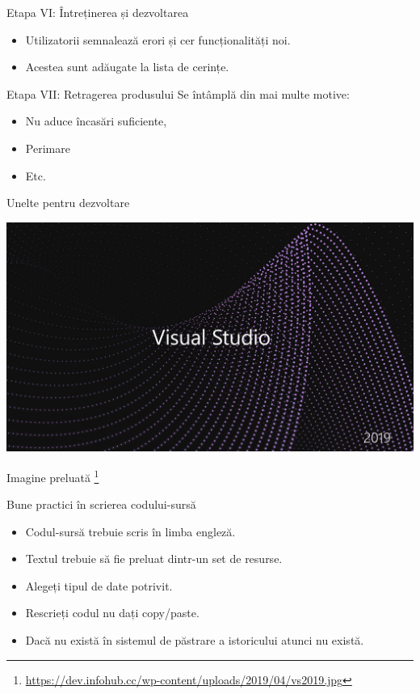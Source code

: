 \documentclass[presentation]{beamer}
\begin{document}
\begin{frame}[label={sec:org74c7abc}]{Etapa VI: Întreținerea și dezvoltarea}
\begin{itemize}
\item Utilizatorii semnalează erori și cer funcționalități noi.
\item Acestea sunt adăugate la lista de cerințe.
\end{itemize}
\end{frame}
\begin{frame}[label={sec:org6eaeac7}]{Etapa VII: Retragerea produsului}
Se întâmplă din mai multe motive:
\begin{itemize}
\item Nu aduce încasări suficiente,
\item Perimare
\item Etc.
\end{itemize}
\end{frame}
\begin{frame}[label={sec:org0ea427d}]{Unelte pentru dezvoltare}
\begin{center}
\includegraphics[width=.9\linewidth]{img/vs2019.jpg}
\end{center}
Imagine preluată \footnote{\url{https://dev.infohub.cc/wp-content/uploads/2019/04/vs2019.jpg}}
\end{frame}
\begin{frame}[label={sec:org284b050}]{Bune practici în scrierea codului-sursă}
\begin{itemize}
\item Codul-sursă trebuie scris în limba engleză.
\item Textul trebuie să fie preluat dintr-un set de resurse.
\item Alegeți tipul de date potrivit.
\item Rescrieți codul nu dați copy/paste.
\item Dacă nu există în sistemul de păstrare a istoricului atunci nu există.
\end{itemize}
\end{frame}
\end{document}
